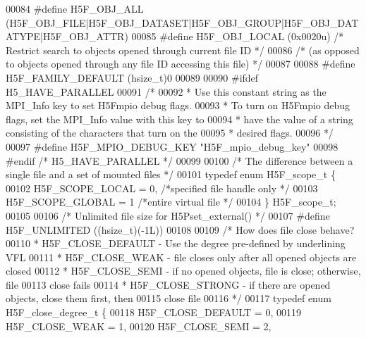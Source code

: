 \begin{DoxyCode}
00084 \textcolor{preprocessor}{#define H5F\_OBJ\_ALL     (H5F\_OBJ\_FILE|H5F\_OBJ\_DATASET|H5F\_OBJ\_GROUP|H5F\_OBJ\_DATATYPE|H5F\_OBJ\_ATTR)}
00085 \textcolor{preprocessor}{#define H5F\_OBJ\_LOCAL   (0x0020u)       }\textcolor{comment}{/* Restrict search to objects opened through current file ID */}\textcolor{preprocessor}{}
00086                                         \textcolor{comment}{/* (as opposed to objects opened through any file ID accessing this
       file) */}
00087 
00088 \textcolor{preprocessor}{#define H5F\_FAMILY\_DEFAULT (hsize\_t)0}
00089 
00090 \textcolor{preprocessor}{#ifdef H5\_HAVE\_PARALLEL}
00091 \textcolor{comment}{/*}
00092 \textcolor{comment}{ * Use this constant string as the MPI\_Info key to set H5Fmpio debug flags.}
00093 \textcolor{comment}{ * To turn on H5Fmpio debug flags, set the MPI\_Info value with this key to}
00094 \textcolor{comment}{ * have the value of a string consisting of the characters that turn on the}
00095 \textcolor{comment}{ * desired flags.}
00096 \textcolor{comment}{ */}
00097 \textcolor{preprocessor}{#define H5F\_MPIO\_DEBUG\_KEY "H5F\_mpio\_debug\_key"}
00098 \textcolor{preprocessor}{#endif }\textcolor{comment}{/* H5\_HAVE\_PARALLEL */}\textcolor{preprocessor}{}
00099 
00100 \textcolor{comment}{/* The difference between a single file and a set of mounted files */}
00101 \textcolor{keyword}{typedef} \textcolor{keyword}{enum} H5F\_scope\_t \{
00102     H5F\_SCOPE\_LOCAL = 0,    \textcolor{comment}{/*specified file handle only        */}
00103     H5F\_SCOPE\_GLOBAL    = 1     \textcolor{comment}{/*entire virtual file           */}
00104 \} H5F\_scope\_t;
00105 
00106 \textcolor{comment}{/* Unlimited file size for H5Pset\_external() */}
00107 \textcolor{preprocessor}{#define H5F\_UNLIMITED   ((hsize\_t)(-1L))}
00108 
00109 \textcolor{comment}{/* How does file close behave?}
00110 \textcolor{comment}{ * H5F\_CLOSE\_DEFAULT - Use the degree pre-defined by underlining VFL}
00111 \textcolor{comment}{ * H5F\_CLOSE\_WEAK    - file closes only after all opened objects are closed}
00112 \textcolor{comment}{ * H5F\_CLOSE\_SEMI    - if no opened objects, file is close; otherwise, file}
00113 \textcolor{comment}{               close fails}
00114 \textcolor{comment}{ * H5F\_CLOSE\_STRONG  - if there are opened objects, close them first, then}
00115 \textcolor{comment}{               close file}
00116 \textcolor{comment}{ */}
00117 \textcolor{keyword}{typedef} \textcolor{keyword}{enum} H5F\_close\_degree\_t \{
00118     H5F\_CLOSE\_DEFAULT   = 0,
00119     H5F\_CLOSE\_WEAK      = 1,
00120     H5F\_CLOSE\_SEMI      = 2,

\end{DoxyCode}
